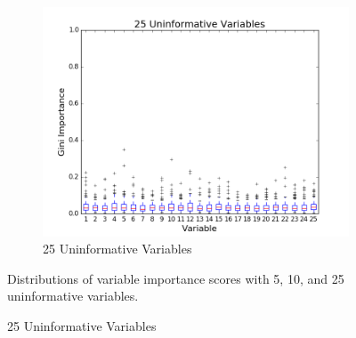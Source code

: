 \begin{figure}[H]
  ~
  \begin{subfigure}[b]{0.45\textwidth}
    \includegraphics[width=\textwidth]{figures/random_forests/rf_variable_count_bias_25.png}
    \caption{25 Uninformative Variables}
    \label{fig:var-count-25}
  \end{subfigure}
  
  Distributions of variable importance scores with 5, 10, and 25 uninformative variables.
  \label{fig:var-count}
\end{figure}

